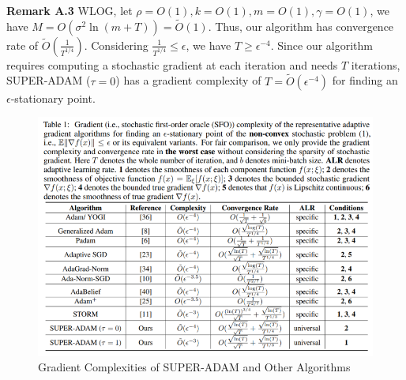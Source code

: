\documentclass{article}
\begin{document}
\textbf{Remark A.3} \label{rmka3} WLOG, let $\rho = O(1), k = O(1), m = O(1), \gamma = O(1)$, we have $M = O(\sigma^2 \ln(m+T)) = \tilde{O}(1)$. Thus, our algorithm has convergence rate of $\tilde{O}\left(\frac{1}{T^{1/4}}\right)$.
Considering $\frac{1}{T^{1/4}}\leq\epsilon$, we have $T\geq\epsilon^{-4}$. Since our algorithm requires computing a stochastic gradient at each iteration and needs $T$ iterations, SUPER-ADAM ($\tau = 0$) has a gradient complexity of $T = \tilde{O}(\epsilon^{-4})$ for finding an
$\epsilon$-stationary point.
\begin{figure}[h]
	\label{fig3}
	\centering
	\includegraphics[scale = 0.5]{super-adam-comparison-table.png}
	\caption{Gradient Complexities of SUPER-ADAM and Other Algorithms}
\end{figure}
\end{document}
